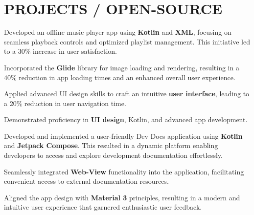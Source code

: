 \documentclass[bold]{deedy-resume-openfont}
\begin{document}
\begin{minipage}[t]{0.66\textwidth}
\section*{PROJECTS / OPEN-SOURCE}
\begin{tightemize}
    \item Developed an offline music player app using \textbf{Kotlin} and \textbf{XML}, focusing on seamless playback controls and optimized playlist management. This initiative led to a 30\% increase in user satisfaction.
    \item Incorporated the \textbf{Glide} library for image loading and rendering, resulting in a 40\% reduction in app loading times and an enhanced overall user experience.
    \item Applied advanced UI design skills to craft an intuitive \textbf{user interface}, leading to a 20\% reduction in user navigation time.
    \item Demonstrated proficiency in \textbf{UI design}, Kotlin, and advanced app development.
\end{tightemize}
\sectionsep

\begin{tightemize}
\item Developed and implemented a user-friendly Dev Docs application using \textbf{Kotlin} and \textbf{Jetpack Compose}. This resulted in a dynamic platform enabling developers to access and explore development documentation effortlessly.
\item Seamlessly integrated \textbf{Web-View} functionality into the application, facilitating convenient access to external documentation resources.
\item Aligned the app design with \textbf{Material 3} principles, resulting in a modern and intuitive user experience that garnered enthusiastic user feedback.
\end{tightemize}
\sectionsep


\end{minipage}
\end{document}
